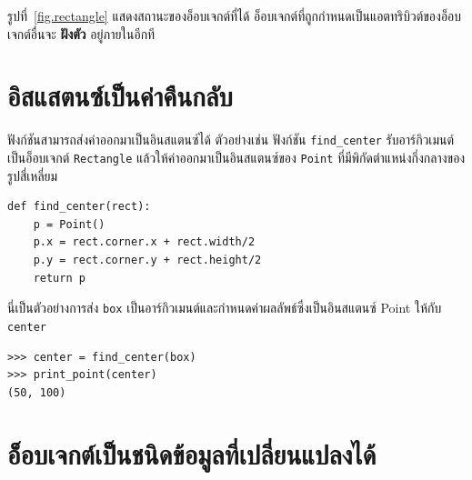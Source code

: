 
รูปที่~\ref{fig.rectangle} แสดงสถานะของอ็อบเจกต์ที่ได้ อ็อบเจกต์ที่ถูกกำหนดเป็นแอตทริบิวต์ของอ็อบเจกต์อื่นจะ {\bf ฝังตัว} อยู่ภายในอีกที



\section{อิสแสตนซ์เป็นค่าคืนกลับ} %


ฟังก์ชันสามารถส่งค่าออกมาเป็นอินสแตนซ์ได้ ตัวอย่างเช่น ฟังก์ชัน \verb"find_center" รับอาร์กิวเมนต์เป็นอ็อบเจกต์ {\tt Rectangle} 
แล้วให้ค่าออกมาเป็นอินสแตนซ์ของ {\tt Point} ที่มีพิกัดตำแหน่งกึ่งกลางของรูปสี่เหลี่ยม

\begin{verbatim}
def find_center(rect):
    p = Point()
    p.x = rect.corner.x + rect.width/2
    p.y = rect.corner.y + rect.height/2
    return p
\end{verbatim}
%

นี่เป็นตัวอย่างการส่ง {\tt box} เป็นอาร์กิวเมนต์และกำหนดค่าผลลัพธ์ซึ่งเป็นอินสแตนซ์ Point ให้กับ {\tt center}

\begin{verbatim}
>>> center = find_center(box)
>>> print_point(center)
(50, 100)
\end{verbatim}
%

\section{อ็อบเจกต์เป็นชนิดข้อมูลที่เปลี่ยนแปลงได้} %

